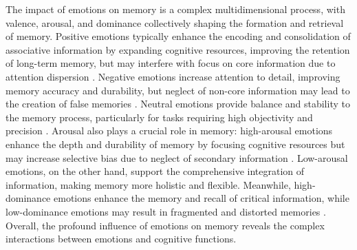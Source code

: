 The impact of emotions on memory is a complex multidimensional process, with valence, arousal, and dominance collectively shaping the formation and retrieval of memory. Positive emotions typically enhance the encoding and consolidation of associative information by expanding cognitive resources, improving the retention of long-term memory, but may interfere with focus on core information due to attention dispersion \cite{lee1999effects}. Negative emotions increase attention to detail, improving memory accuracy and durability, but neglect of non-core information may lead to the creation of false memories \cite{kensinger2007negative, brainerd2008does}. Neutral emotions provide balance and stability to the memory process, particularly for tasks requiring high objectivity and precision \cite{kensinger2006processing}. Arousal also plays a crucial role in memory: high-arousal emotions enhance the depth and durability of memory by focusing cognitive resources but may increase selective bias due to neglect of secondary information \cite{mather2011arousal}. Low-arousal emotions, on the other hand, support the comprehensive integration of information, making memory more holistic and flexible. Meanwhile, high-dominance emotions enhance the memory and recall of critical information, while low-dominance emotions may result in fragmented and distorted memories \cite{fredrickson2001role, schacter2007cognitive}. Overall, the profound influence of emotions on memory reveals the complex interactions between emotions and cognitive functions.

